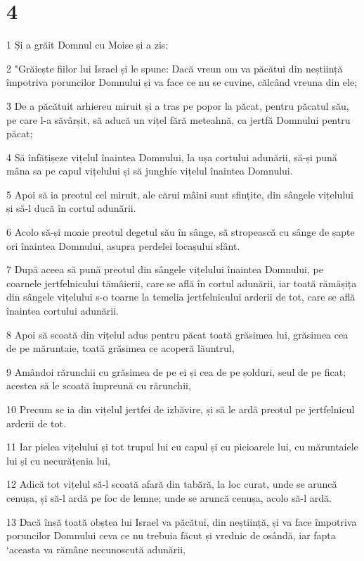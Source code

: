 \chapter{4}

\par 1 Și a grăit Domnul cu Moise și a zis:
\par 2 "Grăiește fiilor lui Israel și le spune: Dacă vreun om va păcătui din neștiință împotriva poruncilor Domnului și va face ce nu se cuvine, călcând vreuna din ele;
\par 3 De a păcătuit arhiereu miruit și a tras pe popor la păcat, pentru păcatul său, pe care l-a săvârșit, să aducă un vițel fără meteahnă, ca jertfă Domnului pentru păcat;
\par 4 Să înfățișeze vițelul înaintea Domnului, la ușa cortului adunării, să-și pună mâna sa pe capul vițelului și să junghie vițelul înaintea Domnului.
\par 5 Apoi să ia preotul cel miruit, ale cărui mâini sunt sfințite, din sângele vițelului și să-l ducă în cortul adunării.
\par 6 Acolo să-și moaie preotul degetul său în sânge, să stropească cu sânge de șapte ori înaintea Domnului, asupra perdelei locașului sfânt.
\par 7 După aceea să pună preotul din sângele vițelului înaintea Domnului, pe coarnele jertfelnicului tămâierii, care se află în cortul adunării, iar toată rămășița din sângele vițelului s-o toarne la temelia jertfelnicului arderii de tot, care se află înaintea cortului adunării.
\par 8 Apoi să scoată din vițelul adus pentru păcat toată grăsimea lui, grăsimea cea de pe măruntaie, toată grăsimea ce acoperă lăuntrul,
\par 9 Amândoi rărunchii cu grăsimea de pe ei și cea de pe șolduri, seul de pe ficat; acestea să le scoată împreună cu rărunchii,
\par 10 Precum se ia din vițelul jertfei de izbăvire, și să le ardă preotul pe jertfelnicul arderii de tot.
\par 11 Iar pielea vițelului și tot trupul lui cu capul și cu picioarele lui, cu măruntaiele lui și cu necurățenia lui,
\par 12 Adică tot vițelul să-l scoată afară din tabără, la loc curat, unde se aruncă cenușa, și să-l ardă pe foc de lemne; unde se aruncă cenușa, acolo să-l ardă.
\par 13 Dacă însă toată obștea lui Israel va păcătui, din neștiință, și va face împotriva poruncilor Domnului ceva ce nu trebuia făcut și vrednic de osândă, iar fapta `aceasta va rămâne necunoscută adunării,
